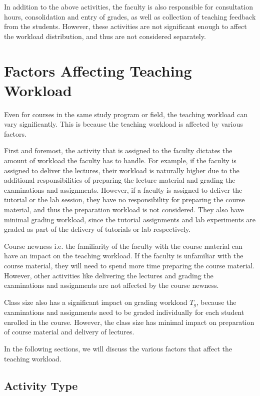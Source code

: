 In addition to the above activities, the faculty is also responsible for consultation hours, consolidation and entry of grades, as well as collection of teaching feedback from the students. However, these activities are not significant enough to affect the workload distribution, and thus are not considered separately.

\section{Factors Affecting Teaching Workload}

Even for courses in the same study program or field, the teaching workload can vary significantly. This is because the teaching workload is affected by various factors.

First and foremost, the activity that is assigned to the faculty dictates the amount of workload the faculty has to handle. For example, if the faculty is assigned to deliver the lectures, their workload is naturally higher due to the additional responsibilities of preparing the lecture material and grading the examinations and assignments. However, if a faculty is assigned to deliver the tutorial or the lab session, they have no responsibility for preparing the course material, and thus the preparation workload is not considered. They also have minimal grading workload, since the tutorial assignments and lab experiments are graded as part of the delivery of tutorials or lab respectively.

Course newness i.e. the familiarity of the faculty with the course material can have an impact on the teaching workload. If the faculty is unfamiliar with the course material, they will need to spend more time preparing the course material. However, other activities like delivering the lectures and grading the examinations and assignments are not affected by the course newness.

Class size also has a significant impact on grading workload \( T_g \), because the examinations and assignments need to be graded individually for each student enrolled in the course. However, the class size has minimal impact on preparation of course material and delivery of lectures.

In the following sections, we will discuss the various factors that affect the teaching workload.

\subsection{Activity Type}
\label{sec:activity_type}

